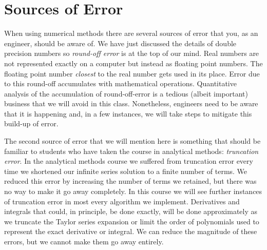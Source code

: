 \section{Sources of Error}   

When using numerical methods there are several sources of error that you, as an engineer, should be aware of.  We have just discussed the details of double precision numbers so \emph{round-off error} is at the top of our mind.  Real numbers are not represented exactly on a computer but instead as floating point numbers.  The floating point number \emph{closest} to the real number gets used in its place. Error due to this round-off accumulates with mathematical operations.  Quantitative analysis of the accumulation of round-off-error is a tedious (albeit important) business that we will avoid in this class.  Nonetheless, engineers need to be aware that it is happening and, in a few instances, we will take steps to mitigate this build-up of error.

The second source of error that we will mention here is something that should be familiar to students who have taken the course in analytical methods: \emph{truncation error}.  In the analytical methods course we suffered from truncation error every time we shortened our infinite series solution to a finite number of terms.  We reduced this error by increasing the number of terms we retained, but there was no way to make it go away completely.  In this course we will see further instances of truncation error in most every algorithm we implement.  Derivatives and integrals that could, in principle, be done exactly, will be done approximately as we truncate the Taylor series expansion or limit the order of polynomials used to represent the exact derivative or integral.  We can reduce the magnitude of these errors, but we cannot make them go away entirely.

